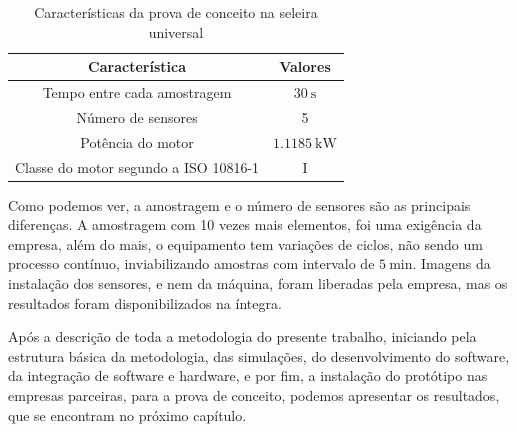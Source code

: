 \begin{table}[H]
    \caption{Características da prova de conceito na seleira universal}
    \label{tab:seleira_universal}
    \centering%
    \begin{minipage}{.55\textwidth}
      \begin{tabular*}{\textwidth}{c|c}
        \hline
        Característica                          & Valores                                    \\ \hline
        \hline
        Tempo entre cada amostragem             &  $\SI{30}{\second}$                        \\
        Número de sensores                      &  5                                         \\ 
        Potência do motor                       &  $\SI{1.1185}{\kilo\watt}$                 \\
        Classe do motor segundo a  ISO 10816-1  &  I                                         \\
      \end{tabular*}
    \end{minipage}
  \end{table}

Como podemos ver, a amostragem e o número de sensores são as principais diferenças. A amostragem com 10 vezes mais elementos, foi uma exigência
da empresa, além do mais, o equipamento tem variações de ciclos, não sendo um processo contínuo, inviabilizando amostras com intervalo de 
$\SI{5}{\minute}$. Imagens da instalação dos sensores, e nem da máquina, foram liberadas pela empresa, mas os resultados foram 
disponibilizados na íntegra.

Após a descrição de toda a metodologia do presente trabalho, iniciando pela estrutura básica da metodologia, das simulações, do desenvolvimento
do software, da integração de software e hardware, e por fim, a instalação do protótipo nas empresas parceiras, para a prova de conceito, 
podemos apresentar os resultados, que se encontram no próximo capítulo.